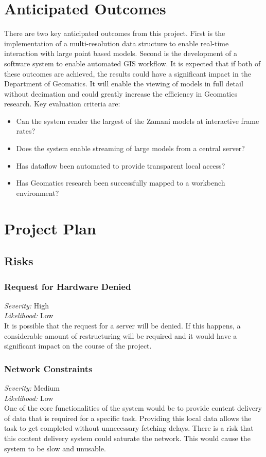 \documentclass[12pt,a4paper]{article}
\begin{document}
\section{Anticipated Outcomes}
There are two key anticipated outcomes from this project. First is the
implementation of a multi-resolution data structure to enable real-time interaction
with large point based models. Second is the development of a software system to
enable automated GIS workflow. It is expected that if both of these outcomes are
achieved, the results could have a significant impact in the Department of
Geomatics. It will enable the viewing of models in full detail without decimation
and could greatly increase the efficiency in Geomatics research. Key evaluation
criteria are:
\begin{itemize}
\item Can the system render the largest of the Zamani models at interactive frame rates?
\item Does the system enable streaming of large models from a central server?
\item Has dataflow been automated to provide transparent local access?
\item Has Geomatics research been successfully mapped to a workbench environment?
\end{itemize}

\section{Project Plan}
\subsection{Risks}
\subsubsection*{Request for Hardware Denied}
\noindent \textit{Severity: } High \\
\noindent \textit{Likelihood: } Low \\
It is possible that the request for a server will be denied. If this happens,
a considerable amount of restructuring will be required and it would have a
significant impact on the course of the project.
\subsubsection*{Network Constraints}
\noindent \textit{Severity: } Medium \\
\noindent \textit{Likelihood: } Low \\
One of the core functionalities of the system would be to provide
content delivery of data that is required for a specific task. Providing
this local data allows the task to get completed without unnecessary
fetching delays. There is a risk that this content delivery system
could saturate the network. This would cause the system to be slow
and unusable.
\end{document}
